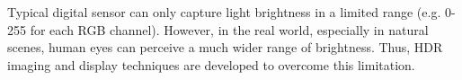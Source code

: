
Typical digital sensor can only capture light brightness 
in a limited range (e.g. 0-255 for each RGB channel).
However, in the real world, especially in natural scenes,
human eyes can perceive a much wider range of brightness.
Thus, HDR imaging and display techniques are developed to
overcome this limitation.

